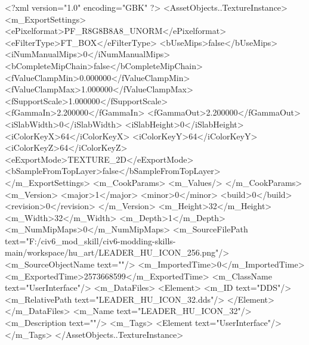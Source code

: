 <?xml version="1.0" encoding="GBK" ?>
<AssetObjects..TextureInstance>
	<m_ExportSettings>
		<ePixelformat>PF_R8G8B8A8_UNORM</ePixelformat>
		<eFilterType>FT_BOX</eFilterType>
		<bUseMips>false</bUseMips>
		<iNumManualMips>0</iNumManualMips>
		<bCompleteMipChain>false</bCompleteMipChain>
		<fValueClampMin>0.000000</fValueClampMin>
		<fValueClampMax>1.000000</fValueClampMax>
		<fSupportScale>1.000000</fSupportScale>
		<fGammaIn>2.200000</fGammaIn>
		<fGammaOut>2.200000</fGammaOut>
		<iSlabWidth>0</iSlabWidth>
		<iSlabHeight>0</iSlabHeight>
		<iColorKeyX>64</iColorKeyX>
		<iColorKeyY>64</iColorKeyY>
		<iColorKeyZ>64</iColorKeyZ>
		<eExportMode>TEXTURE_2D</eExportMode>
		<bSampleFromTopLayer>false</bSampleFromTopLayer>
	</m_ExportSettings>
	<m_CookParams>
		<m_Values/>
	</m_CookParams>
	<m_Version>
		<major>1</major>
		<minor>0</minor>
		<build>0</build>
		<revision>0</revision>
	</m_Version>
	<m_Height>32</m_Height>
	<m_Width>32</m_Width>
	<m_Depth>1</m_Depth>
	<m_NumMipMaps>0</m_NumMipMaps>
	<m_SourceFilePath text="F:/civ6_mod_skill/civ6-modding-skills-main/workspace/hu_art/LEADER_HU_ICON_256.png"/>
	<m_SourceObjectName text=""/>
	<m_ImportedTime>0</m_ImportedTime>
	<m_ExportedTime>2573668599</m_ExportedTime>
	<m_ClassName text="UserInterface"/>
	<m_DataFiles>
		<Element>
			<m_ID text="DDS"/>
			<m_RelativePath text="LEADER_HU_ICON_32.dds"/>
		</Element>
	</m_DataFiles>
	<m_Name text="LEADER_HU_ICON_32"/>
	<m_Description text=""/>
	<m_Tags>
		<Element text="UserInterface"/>
	</m_Tags>
</AssetObjects..TextureInstance>

